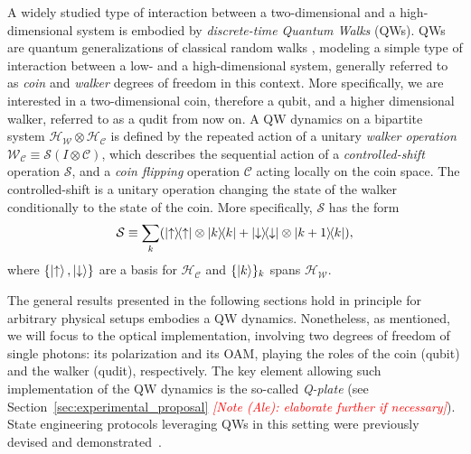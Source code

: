 \documentclass[
	aps, pra,
	superscriptaddress, twocolumn,
	floatfix,
	10pt
]{revtex4-1}
\newcommand{\parTitle}[1]{\noindent{\color{Mahogany}(\emph{#1})}}
\newcommand{\calC}{{\mathcal{C}}}
\newcommand{\calH}{{\mathcal{H}}}
\newcommand{\calS}{{\mathcal{S}}}
\newcommand{\calW}{{\mathcal{W}}}
\newcommand{\HC}{\calH_{\calC}}
\newcommand{\HW}{\calH_{\calW}}
\newcommand{\LI}[1]{\highlight{(LI: \textit{#1})}}
\newcommand{\commale}[1]{{\textcolor{red} {\it{[Note (Ale): #1]}}}}
\begin{document}
\parTitle{Background on QWs}
A widely studied type of interaction between a two-dimensional and a high-dimensional system is embodied by \textit{discrete-time Quantum Walks} (QWs)\LI{(refs)}.
QWs are quantum generalizations of classical random walks \LI{(refs)}, modeling a simple type of interaction between a low- and a high-dimensional system, generally referred to as \textit{coin} and \textit{walker} degrees of freedom in this context.
More specifically, we are interested in a two-dimensional coin, therefore a qubit, and a higher dimensional walker, referred to as a qudit from now on. A QW dynamics on a bipartite system $\HW\otimes\HC$ is defined by the repeated action of a unitary \textit{walker operation} $\calW_\calC\equiv \calS(I\otimes \calC)$, which describes the sequential action of a \textit{controlled-shift} operation $\calS$, and a \textit{coin flipping} operation $\calC$ acting locally on the coin space.
The controlled-shift is a unitary operation changing the state of the walker conditionally to the state of the coin.
More specifically, $\calS$ has the form
\begin{equation}
    \calS \equiv \sum_k (
        \ketbra\uparrow\otimes \ketbra{k}{k} +
        \ketbra\downarrow\otimes \ketbra{k+1}{k}
    ),
\end{equation}
where $\{\ket\uparrow,\ket\downarrow\}$ are a basis for $\HC$ and $\{\ket k\}_k$ spans $\HW$.

The general results presented in the following sections hold in principle for arbitrary physical setups embodies a QW dynamics. Nonetheless, as mentioned, we will focus to the optical implementation, involving two degrees of freedom of single photons: its polarization and its OAM, playing the roles of the coin (qubit) and the walker (qudit), respectively.
The key element allowing such implementation of the QW dynamics is the so-called \textit{Q-plate} (see Section~\ref{sec:experimental_proposal} \commale{elaborate further if necessary}).
State engineering protocols leveraging QWs in this setting were previously devised and demonstrated~\cite{innocenti2017quantum,giordani2019experimental,giordani2020machine}.

\end{document}
